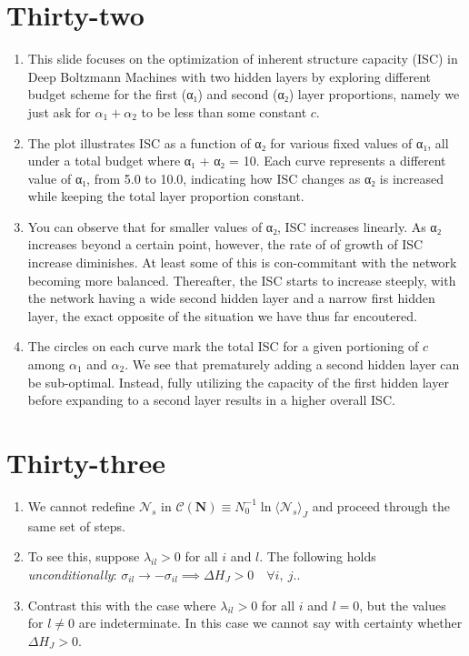 \documentclass{article}
\begin{document}
\section*{Thirty-two}
\begin{enumerate}
    \item This slide focuses on the optimization of inherent structure capacity (ISC) in Deep Boltzmann Machines with two hidden layers by exploring different budget scheme for the first (α₁) and second (α₂) layer proportions, namely we just ask for \(\alpha_{1} + \alpha_{2}\) to be less than some constant \(c\).
    \item The plot illustrates ISC as a function of α₂ for various fixed values of α₁, all under a total budget where α₁ + α₂ = 10. Each curve represents a different value of α₁, from 5.0 to 10.0, indicating how ISC changes as α₂ is increased while keeping the total layer proportion constant.
    \item You can observe that for smaller values of α₂, ISC increases linearly. As α₂ increases beyond a certain point, however, the rate of of growth of ISC increase diminishes. At least some of this is con-commitant with the network becoming more balanced. Thereafter, the ISC starts to increase steeply, with the network having a wide second hidden layer and a narrow first hidden layer, the exact opposite of the situation we have thus far encoutered.
    \item The circles on each curve mark the total ISC for a given portioning of \(c\) among \(\alpha_{1}\) and \(\alpha_{2}\). We see that prematurely adding a second hidden layer can be sub-optimal. Instead, fully utilizing the capacity of the first hidden layer before expanding to a second layer results in a higher overall ISC.
\end{enumerate}

\section*{Thirty-three}
\begin{enumerate}
    \item We cannot redefine \(\mathcal{N}_{s}\) in \(\mathcal{C} (\boldsymbol{N}) \equiv N_{0}^{-1} \ln \langle \mathcal{N}_{s} \rangle_{J}\) and proceed through the same set of steps.
    \item To see this, suppose \(\lambda_{il} > 0\) for all \(i\) and \(l\). The following holds \emph{unconditionally}: \(\sigma_{il} \to -\sigma_{il} \implies \Delta H_{J} > 0 \quad \forall i,~ j.\).
    \item Contrast this with the case where \(\lambda_{il} > 0\) for all \(i\) and \(l = 0\), but the values for \(l \neq 0\) are indeterminate. In this case we cannot say with certainty whether \(\Delta H_J > 0\).
\end{enumerate}
\end{document}
